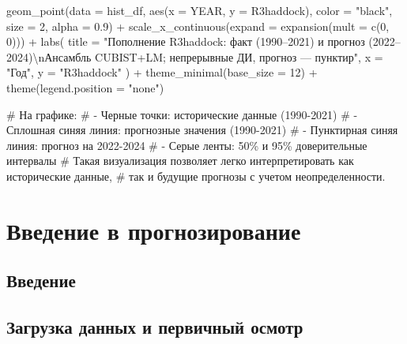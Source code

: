 \documentclass[
  letterpaper,
  DIV=11,
  numbers=noendperiod]{scrreprt}
\newenvironment{Shaded}{\begin{snugshade}}{\end{snugshade}}
\newcommand{\AttributeTok}[1]{\textcolor[rgb]{0.40,0.45,0.13}{#1}}
\newcommand{\CommentTok}[1]{\textcolor[rgb]{0.37,0.37,0.37}{#1}}
\newcommand{\DecValTok}[1]{\textcolor[rgb]{0.68,0.00,0.00}{#1}}
\newcommand{\FloatTok}[1]{\textcolor[rgb]{0.68,0.00,0.00}{#1}}
\newcommand{\FunctionTok}[1]{\textcolor[rgb]{0.28,0.35,0.67}{#1}}
\newcommand{\NormalTok}[1]{\textcolor[rgb]{0.00,0.23,0.31}{#1}}
\newcommand{\SpecialCharTok}[1]{\textcolor[rgb]{0.37,0.37,0.37}{#1}}
\newcommand{\StringTok}[1]{\textcolor[rgb]{0.13,0.47,0.30}{#1}}
\begin{document}
\begin{Shaded}
\begin{Highlighting}[]
  \FunctionTok{geom\_point}\NormalTok{(}\AttributeTok{data =}\NormalTok{ hist\_df, }\FunctionTok{aes}\NormalTok{(}\AttributeTok{x =}\NormalTok{ YEAR, }\AttributeTok{y =}\NormalTok{ R3haddock),}
             \AttributeTok{color =} \StringTok{"black"}\NormalTok{, }\AttributeTok{size =} \DecValTok{2}\NormalTok{, }\AttributeTok{alpha =} \FloatTok{0.9}\NormalTok{) }\SpecialCharTok{+}
  \FunctionTok{scale\_x\_continuous}\NormalTok{(}\AttributeTok{expand =} \FunctionTok{expansion}\NormalTok{(}\AttributeTok{mult =} \FunctionTok{c}\NormalTok{(}\DecValTok{0}\NormalTok{, }\DecValTok{0}\NormalTok{))) }\SpecialCharTok{+}
  \FunctionTok{labs}\NormalTok{(}
    \AttributeTok{title =} \StringTok{"Пополнение R3haddock: факт (1990–2021) и прогноз (2022–2024)}\SpecialCharTok{\textbackslash{}n}\StringTok{Ансамбль CUBIST+LM; непрерывные ДИ, прогноз — пунктир"}\NormalTok{,}
    \AttributeTok{x =} \StringTok{"Год"}\NormalTok{, }\AttributeTok{y =} \StringTok{"R3haddock"}
\NormalTok{  ) }\SpecialCharTok{+}
  \FunctionTok{theme\_minimal}\NormalTok{(}\AttributeTok{base\_size =} \DecValTok{12}\NormalTok{) }\SpecialCharTok{+}
  \FunctionTok{theme}\NormalTok{(}\AttributeTok{legend.position =} \StringTok{"none"}\NormalTok{)}

\CommentTok{\# На графике:}
\CommentTok{\#   {-} Черные точки: исторические данные (1990{-}2021)}
\CommentTok{\#   {-} Сплошная синяя линия: прогнозные значения (1990{-}2021)}
\CommentTok{\#   {-} Пунктирная синяя линия: прогноз на 2022{-}2024}
\CommentTok{\#   {-} Серые ленты: 50\% и 95\% доверительные интервалы}
\CommentTok{\# Такая визуализация позволяет легко интерпретировать как исторические данные, }
\CommentTok{\# так и будущие прогнозы с учетом неопределенности.}
\end{Highlighting}
\end{Shaded}


\chapter{Введение в
прогнозирование}\label{ux432ux432ux435ux434ux435ux43dux438ux435-ux432-ux43fux440ux43eux433ux43dux43eux437ux438ux440ux43eux432ux430ux43dux438ux435}

\section{Введение}\label{ux432ux432ux435ux434ux435ux43dux438ux435-7}

\section{Загрузка данных и первичный
осмотр}\label{ux437ux430ux433ux440ux443ux437ux43aux430-ux434ux430ux43dux43dux44bux445-ux438-ux43fux435ux440ux432ux438ux447ux43dux44bux439-ux43eux441ux43cux43eux442ux440-1}
\end{document}
